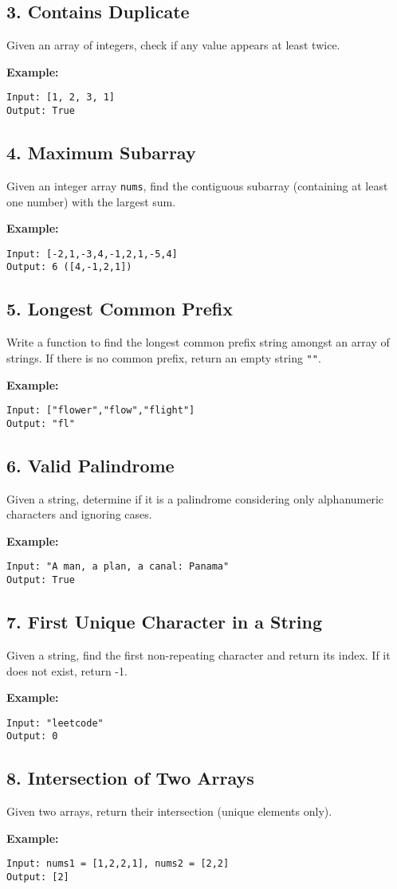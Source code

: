 \documentclass[12pt]{article}
\begin{document}
\subsection*{3. Contains Duplicate}
Given an array of integers, check if any value appears at least twice.

\textbf{Example:}
\begin{verbatim}
Input: [1, 2, 3, 1]
Output: True
\end{verbatim}

\subsection*{4. Maximum Subarray}
Given an integer array \texttt{nums}, find the contiguous subarray (containing at least one number) with the largest sum.

\textbf{Example:}
\begin{verbatim}
Input: [-2,1,-3,4,-1,2,1,-5,4]
Output: 6 ([4,-1,2,1])
\end{verbatim}

\subsection*{5. Longest Common Prefix}
Write a function to find the longest common prefix string amongst an array of strings. If there is no common prefix, return an empty string \texttt{""}.

\textbf{Example:}
\begin{verbatim}
Input: ["flower","flow","flight"]
Output: "fl"
\end{verbatim}

\subsection*{6. Valid Palindrome}
Given a string, determine if it is a palindrome considering only alphanumeric characters and ignoring cases.

\textbf{Example:}
\begin{verbatim}
Input: "A man, a plan, a canal: Panama"
Output: True
\end{verbatim}

\subsection*{7. First Unique Character in a String}
Given a string, find the first non-repeating character and return its index. If it does not exist, return -1.

\textbf{Example:}
\begin{verbatim}
Input: "leetcode"
Output: 0
\end{verbatim}

\subsection*{8. Intersection of Two Arrays}
Given two arrays, return their intersection (unique elements only).

\textbf{Example:}
\begin{verbatim}
Input: nums1 = [1,2,2,1], nums2 = [2,2]
Output: [2]
\end{verbatim}
\end{document}
